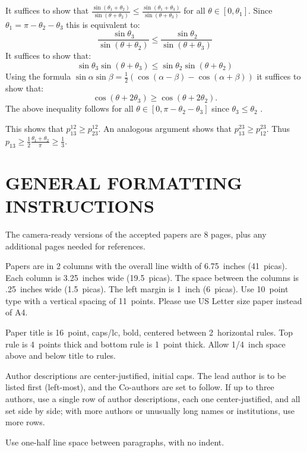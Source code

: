 \documentclass[twoside]{article}
\begin{document}
It suffices to show that $\frac{\sin(\theta_1 + \theta_2)}{\sin (\theta + \theta_2)} \le \frac{\sin (\theta_1 + \theta_3)}{\sin (\theta + \theta_3)}$ for all $\theta \in [0, \theta_1]$.
Since $\theta_1 = \pi - \theta_2 - \theta_3$ this is equivalent to:
$$\frac{\sin\theta_3}{\sin (\theta + \theta_2)} \le \frac{\sin\theta_2}{\sin(\theta + \theta_3)}$$
It suffices to show that:
$$\sin\theta_3 \sin(\theta + \theta_3) \le \sin \theta_2 \sin (\theta + \theta_2)$$
Using the formula $\sin \alpha \sin \beta = \frac12(\cos(\alpha - \beta) - \cos(\alpha + \beta))$ it suffices to show that:
$$\cos(\theta + 2 \theta_3) \ge \cos(\theta + 2 \theta_2).$$
The above inequality follows for all $\theta \in [0, \pi - \theta_2 - \theta_3]$ since $\theta_3 \le \theta_2$ .

This shows that $p_{13}^{12} \ge p_{23}^{12}$. An analogous argument shows that $p_{13}^{23} \ge p_{12}^{23}$. Thus $p_{13} \ge \frac12 \frac{\theta_1 + \theta_2}{\pi} \ge \frac13$.




\newpage
\appendix

\section{GENERAL FORMATTING INSTRUCTIONS}

The camera-ready versions of the accepted papers are 8 pages,
plus any additional pages needed for references.

Papers are in 2 columns with the overall line width of 6.75~inches (41~picas).
Each column is 3.25~inches wide (19.5~picas).  The space
between the columns is .25~inches wide (1.5~picas).  The left margin is 1~inch (6~picas).
Use 10~point type with a vertical spacing of
11~points. Please use US Letter size paper instead of A4.

Paper title is 16~point, caps/lc, bold, centered between 2~horizontal rules.
Top rule is 4~points thick and bottom rule is 1~point thick.
Allow 1/4~inch space above and below title to rules.

Author descriptions are center-justified, initial caps.  The lead
author is to be listed first (left-most), and the Co-authors are set
to follow.  If up to three authors, use a single row of author
descriptions, each one center-justified, and all set side by side;
with more authors or unusually long names or institutions, use more
rows.

Use one-half line space between paragraphs, with no indent.
\end{document}
